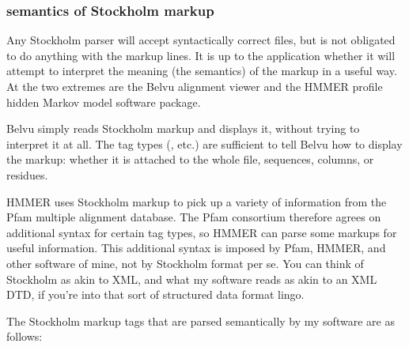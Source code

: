 \subsubsection{semantics of Stockholm markup}

Any Stockholm parser will accept syntactically correct files, but is
not obligated to do anything with the markup lines. It is up to the
application whether it will attempt to interpret the meaning (the
semantics) of the markup in a useful way. At the two extremes are the
Belvu alignment viewer and the HMMER profile hidden Markov model
software package.

Belvu simply reads Stockholm markup and displays it, without trying to
interpret it at all. The tag types (, etc.) are sufficient
to tell Belvu how to display the markup: whether it is attached to the
whole file, sequences, columns, or residues.

HMMER uses Stockholm markup to pick up a variety of information from
the Pfam multiple alignment database. The Pfam consortium therefore
agrees on additional syntax for certain tag types, so HMMER can parse
some markups for useful information. This additional syntax is imposed
by Pfam, HMMER, and other software of mine, not by Stockholm format
per se. You can think of Stockholm as akin to XML, and what my
software reads as akin to an XML DTD, if you're into that sort of
structured data format lingo.

The Stockholm markup tags that are parsed semantically by my software
are as follows:


